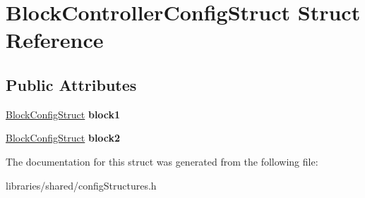 \hypertarget{struct_block_controller_config_struct}{}\section{Block\+Controller\+Config\+Struct Struct Reference}
\label{struct_block_controller_config_struct}
\subsection*{Public Attributes}
\begin{DoxyCompactItemize}
\item 
\mbox{\label{struct_block_controller_config_struct_a31980b2df46309ef57dcf486bf9314de}} 
\hyperlink{struct_block_config_struct}{Block\+Config\+Struct} {\bfseries block1}
\item 
\mbox{\label{struct_block_controller_config_struct_aa127d06b132e8fe4b7f3cfda71e4d208}} 
\hyperlink{struct_block_config_struct}{Block\+Config\+Struct} {\bfseries block2}
\end{DoxyCompactItemize}


The documentation for this struct was generated from the following file\+:\begin{DoxyCompactItemize}
\item 
libraries/shared/config\+Structures.\+h\end{DoxyCompactItemize}
